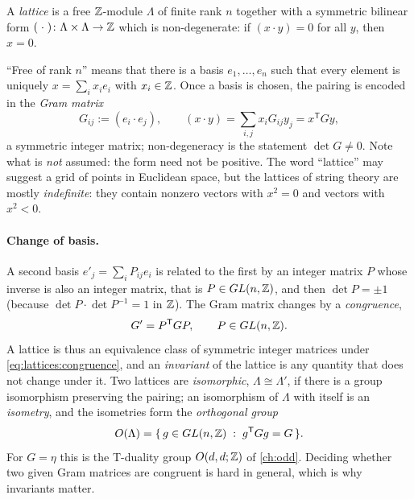 \begin{definition}[Lattice]\label{def:lattices:lattice}
A \emph{lattice} is a free $\mathbb{Z}$-module $\Lambda$ of finite rank $n$ together
with a symmetric bilinear form $(\;\cdot\;)\colon\Lambda\times\Lambda\to\mathbb{Z}$ which is
non-degenerate: if $(x\cdot y)=0$ for all $y$, then $x=0$.
\end{definition}

``Free of rank $n$'' means that there is a basis $e_1,\dots,e_n$ such that every element is
uniquely $x=\sum_i x_ie_i$ with $x_i\in\mathbb{Z}$. Once a basis is chosen, the pairing is encoded in
the \emph{Gram matrix}
\begin{equation}\label{eq:lattices:gram}
 G_{ij}:=(e_i\cdot e_j),\qquad (x\cdot y)=\sum_{i,j}x_iG_{ij}y_j=x^{\mathsf T}Gy ,
\end{equation}
a symmetric integer matrix; non-degeneracy is the statement $\det G\neq0$. Note what is
\emph{not} assumed: the form need not be positive. The word ``lattice'' may suggest a grid of
points in Euclidean space, but the lattices of string theory are mostly \emph{indefinite}:
they contain nonzero vectors with $x^2=0$ and vectors with $x^2<0$.

\paragraph{Change of basis.} A second basis $e'_j=\sum_iP_{ij}e_i$ is related to the first by
an integer matrix $P$ whose inverse is also an integer matrix, that is $P\in GL(n,\mathbb{Z})$, and
then $\det P=\pm1$ (because $\det P\cdot\det P^{-1}=1$ in $\mathbb{Z}$). The Gram matrix changes by a
\emph{congruence},
\begin{equation}\label{eq:lattices:congruence}
 G'=P^{\mathsf T}GP,\qquad P\in GL(n,\mathbb{Z}).
\end{equation}
A lattice is thus an equivalence class of symmetric integer matrices under
\eqref{eq:lattices:congruence}, and an \emph{invariant} of the lattice is any quantity that
does not change under it. Two lattices are \emph{isomorphic}, $\Lambda\cong\Lambda'$, if there
is a group isomorphism preserving the pairing; an isomorphism of $\Lambda$ with itself is an
\emph{isometry}, and the isometries form the \emph{orthogonal group}
\begin{equation}\label{eq:lattices:OLambda}
 O(\Lambda)=\{\,g\in GL(n,\mathbb{Z})\;:\;g^{\mathsf T}Gg=G\,\}.
\end{equation}
For $G=\eta$ this is the T-duality group $O(d,d;\mathbb{Z})$ of \cref{ch:odd}. Deciding whether two
given Gram matrices are congruent is hard in general, which is why invariants matter.

